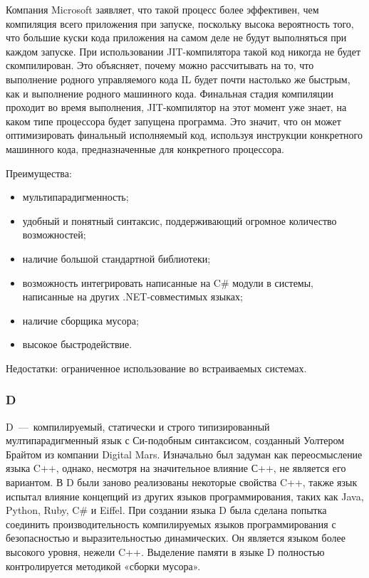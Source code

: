 Компания Microsoft заявляет, что такой процесс более эффективен, чем компиляция всего приложения при запуске, поскольку высока вероятность того, что большие куски кода приложения на самом деле не будут выполняться при каждом запуске. При использовании JIT-компилятора такой код никогда не будет скомпилирован. Это объясняет, почему можно рассчитывать на то, что выполнение родного управляемого кода IL будет почти настолько же быстрым, как и выполнение родного машинного кода. Финальная стадия компиляции проходит во время выполнения, JIT-компилятор на этот момент уже знает, на каком типе процессора будет запущена программа. Это значит, что он может оптимизировать финальный исполняемый код, используя инструкции конкретного машинного кода, предназначенные для конкретного процессора.

Преимущества:
\begin{itemize}
	\item мультипарадигменность;
	\item удобный и понятный синтаксис, поддерживающий огромное количество возможностей;
	\item наличие большой стандартной библиотеки;
	\item возможность интегрировать написанные на C\# модули в системы, написанные на других .NET-совместимых языках;
	\item наличие сборщика мусора;
	\item высокое быстродействие.
\end{itemize}

Недостатки: ограниченное использование во встраиваемых системах.~\cite{WikiCSharp}

\subsubsection{D}
D~---~компилируемый, статически и строго типизированный мултипарадигменный язык с Си-подобным синтаксисом, созданный Уолтером Брайтом из компании Digital Mars. Изначально был задуман как переосмысление языка C++, однако, несмотря на значительное влияние С++, не является его вариантом. В D были заново реализованы некоторые свойства C++, также язык испытал влияние концепций из других языков программирования, таких как Java, Python, Ruby, C\# и Eiffel. При создании языка D была сделана попытка соединить производительность компилируемых языков программирования с безопасностью и выразительностью динамических. Он является языком более высокого уровня, нежели C++. Выделение памяти в языке D полностью контролируется методикой «сборки мусора».

